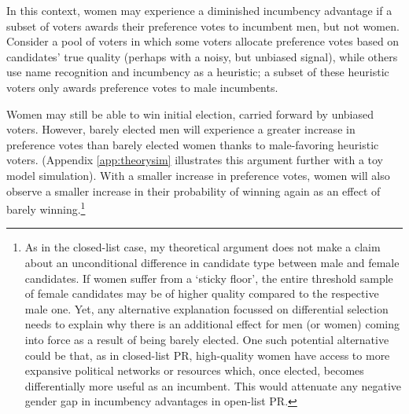 \documentclass[12pt]{article}
\begin{document}
In this context, women may experience a diminished incumbency advantage if a subset of voters awards their preference votes to incumbent men, but not women. Consider a pool of voters in which some voters allocate preference votes based on candidates' true quality (perhaps with a noisy, but unbiased signal), while others use name recognition and incumbency as a heuristic; a subset of these heuristic voters only awards preference votes to male incumbents.

Women may still be able to win initial election, carried forward by unbiased voters. However, barely elected men will experience a greater increase in preference votes than barely elected women thanks to male-favoring heuristic voters. (Appendix \ref{app:theorysim} illustrates this argument further with a toy model simulation). With a smaller increase in preference votes, women will also observe a smaller increase in their probability of winning again as an effect of barely winning.\footnote{As in the closed-list case, my theoretical argument does not make a claim about an unconditional difference in candidate type between male and female candidates. If women suffer from a `sticky floor', the entire threshold sample of female candidates may be of higher quality compared to the respective male one. Yet, any alternative explanation focussed on differential selection needs to explain why there is an additional effect for men (or women) coming into force as a result of being barely elected. One such potential alternative could be that, as in closed-list PR, high-quality women have access to more expansive political networks or resources which, once elected, becomes differentially more useful as an incumbent. This would attenuate any negative gender gap in incumbency advantages in open-list PR.}
\end{document}
